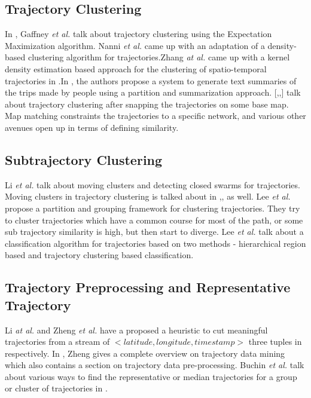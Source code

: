 \subsection{Trajectory Clustering}
In \cite{gaffney1999trajectory}, Gaffney \emph{et al.} talk about trajectory clustering using the Expectation Maximization algorithm. Nanni \emph{et al.} \cite{nanni2006time} came up with an adaptation of a density-based clustering algorithm for trajectories.Zhang \emph{at al.} came up with a kernel density estimation based approach for the clustering of spatio-temporal trajectories in \cite{Zhang}.In \cite{su2015making}, the authors propose a system to generate text summaries of the trips made by people using a partition and summarization approach. [\cite{mapmatch1},\cite{mapmatch2},\cite{mapmatch3}] talk about trajectory clustering after snapping the trajectories on some base map. Map matching constraints the trajectories to a specific network, and various other avenues open up in terms of defining similarity.

\subsection{Subtrajectory Clustering}
Li \emph{et al.}\cite{Li2010} talk about moving clusters and detecting closed swarms for trajectories. Moving clusters in trajectory clustering is talked about in \cite{flock1},\cite{flock2},\cite{flock3} as well. Lee \emph{et al.} \cite{Lee2007} propose a partition and grouping framework for clustering trajectories. They try to cluster trajectories which have a common course for most of the path, or some sub trajectory similarity is high, but then start to diverge. Lee \emph{et al.} talk about a classification algorithm for trajectories based on two methods - hierarchical region based and trajectory clustering based classification. 

\subsection{Trajectory Preprocessing and Representative Trajectory}
Li \emph{at al.} and Zheng \emph{et al.} have a proposed a heuristic to cut meaningful trajectories from a stream of $<latitude, longitude, timestamp>$ three tuples in \cite{trajcut1,trajcut2} respectively. In \cite{trajcut3}, Zheng gives a complete overview on trajectory data mining which also contains a section on trajectory data pre-processing.  
Buchin \emph{et al.} talk about various ways to find the representative or median trajectories for a group or cluster of trajectories in \cite{median1}.

